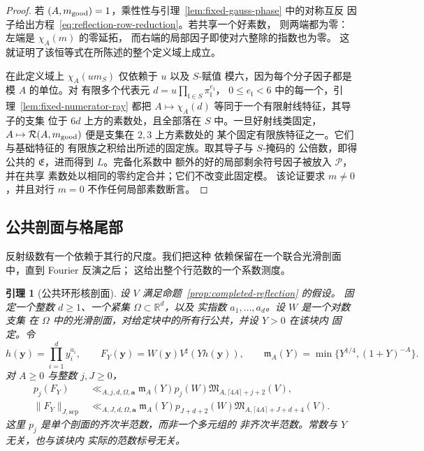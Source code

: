 \documentclass[11pt,a4paper]{article}
\numberwithin{equation}{section}
\numberwithin{figure}{section}
\newtheorem{lemma}[theorem]{引理}
\theoremstyle{definition}
\theoremstyle{remark}
\begin{document}
\begin{proof}
若 $(A,m_{\rm good})=1$，乘性性与引理~\ref{lem:fixed-gauss-phase} 中的对称互反
因子给出方程~\eqref{eq:reflection-row-reduction}。若共享一个好素数，
则两端都为零：左端是 $\chi_A(m)$ 的零延拓，
而右端的局部因子即使对六整除的指数也为零。
这就证明了该恒等式在所陈述的整个定义域上成立。

在此定义域上 $\chi_A(u m_S)$ 仅依赖于 $u$ 以及 $S$-赋值
模六，因为每个分子因子都是模 $A$ 的单位。对
有限多个代表元
$d=u\prod_{\mathfrak l\in S}\pi_{\mathfrak l}^{e_{\mathfrak l}}$，
$0\le e_{\mathfrak l}<6$ 中的每一个，引理~\ref{lem:fixed-numerator-ray} 都把
$A\mapsto\chi_A(d)$ 等同于一个有限射线特征，其导子的支集
位于 $6d$ 上方的素数处，且全部落在 $S$ 中。一旦好射线类固定，
$A\mapsto\mathcal R(A,m_{\rm good})$ 便是支集在 $2,3$ 上方素数处的
某个固定有限族特征之一。它们与基础特征的
有限族之积给出所述的固定族。取其导子与 $S$-掩码的
公倍数，即得公共的 $\mathfrak E$，进而得到 $L$。完备化系数中
额外的好的局部剩余符号因子被放入 $\mathcal P$，并在共享
素数处以相同的零约定合并；它们不改变此固定模。
该论证要求 $m\ne0$，并且对行
$m=0$ 不作任何局部素数断言。
\end{proof}

\subsection{公共剖面与格尾部}

反射级数有一个依赖于其行的尺度。我们把这种
依赖保留在一个联合光滑剖面中，直到 Fourier 反演之后；
这给出整个行范数的一个系数测度。

\begin{lemma}[公共环形核剖面]
\label{lem:reflection-common-profile}
设 $V$ 满足命题~\ref{prop:completed-reflection} 的假设。
固定一个整数 $d\ge1$、一个紧集 $\Omega\subset\mathbb R^d$，以及
实指数 $a_1,\ldots,a_d$。设 $W$ 是一个对数支集
在 $\Omega$ 中的光滑剖面，对给定块中的所有行公共，并设 $Y>0$ 在该块内
固定。令
\[
 h(\boldsymbol y)=\prod_{i=1}^d y_i^{a_i},\qquad
 F_Y(\boldsymbol y)=W(\boldsymbol y)V^\sharp(Yh(\boldsymbol y)),\qquad
 \mathfrak m_A(Y)=\min\{Y^{1/4},(1+Y)^{-A}\}.
\]
对 $A\ge0$ 与整数 $j,J\ge0$，
\begin{align}
 p_j(F_Y)&\ll_{A,j,d,\Omega,\boldsymbol a}
 \mathfrak m_A(Y)p_j(W)
 \mathfrak M_{A,\lceil4A\rceil+j+2}(V),
 \label{eq:reflection-common-profile}\\
 \|F_Y\|_{J,\mathrm{sep}}&\ll_{A,J,d,\Omega,\boldsymbol a}
 \mathfrak m_A(Y)p_{J+d+2}(W)
 \mathfrak M_{A,\lceil4A\rceil+J+d+4}(V).
 \label{eq:reflection-common-measure}
\end{align}
这里 $p_j$ 是单个剖面的齐次半范数，而非一个多元组的
非齐次半范数。常数与 $Y$ 无关，也与该块内
实际的范数标号无关。
\end{lemma}
\end{document}
